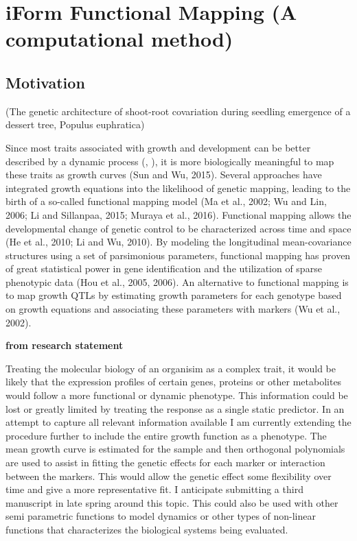\documentclass[]{book}
\theoremstyle{definition}
\theoremstyle{definition}
\theoremstyle{remark}
\begin{document}
\chapter{iForm Functional Mapping (A computational
method)}\label{iform-functional-mapping-a-computational-method}

\section{Motivation}\label{motivation-2}

(The genetic architecture of shoot-root covariation during seedling
emergence of a dessert tree, Populus euphratica)

Since most traits associated with growth and development can be better
described by a dynamic process (\cite{hernandez2015understanding},
\cite{muraya2017genetic}), it is more biologically meaningful to map
these traits as growth curves (Sun and Wu, 2015). Several approaches
have integrated growth equations into the likelihood of genetic mapping,
leading to the birth of a so-called functional mapping model (Ma et al.,
2002; Wu and Lin, 2006; Li and Sillanpaa, 2015; Muraya et al., 2016).
Functional mapping allows the developmental change of genetic control to
be characterized across time and space (He et al., 2010; Li and Wu,
2010). By modeling the longitudinal mean-covariance structures using a
set of parsimonious parameters, functional mapping has proven of great
statistical power in gene identification and the utilization of sparse
phenotypic data (Hou et al., 2005, 2006). An alternative to functional
mapping is to map growth QTLs by estimating growth parameters for each
genotype based on growth equations and associating these parameters with
markers (Wu et al., 2002).

\textbf{from research statement}

Treating the molecular biology of an organisim as a complex trait, it
would be likely that the expression profiles of certain genes, proteins
or other metabolites would follow a more functional or dynamic
phenotype. This information could be lost or greatly limited by treating
the response as a single static predictor. In an attempt to capture all
relevant information available I am currently extending the procedure
further to include the entire growth function as a phenotype. The mean
growth curve is estimated for the sample and then orthogonal polynomials
are used to assist in fitting the genetic effects for each marker or
interaction between the markers. This would allow the genetic effect
some flexibility over time and give a more representative fit. I
anticipate submitting a third manuscript in late spring around this
topic. This could also be used with other semi parametric functions to
model dynamics or other types of non-linear functions that characterizes
the biological systems being evaluated.
\end{document}
